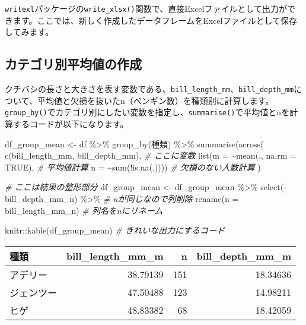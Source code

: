 \documentclass[
  xelatex,ja=standard, b5paper]{bxjsbook}
\newenvironment{Shaded}{\begin{snugshade}}{\end{snugshade}}
\newcommand{\AttributeTok}[1]{\textcolor[rgb]{0.77,0.63,0.00}{#1}}
\newcommand{\CommentTok}[1]{\textcolor[rgb]{0.56,0.35,0.01}{\textit{#1}}}
\newcommand{\ConstantTok}[1]{\textcolor[rgb]{0.00,0.00,0.00}{#1}}
\newcommand{\FunctionTok}[1]{\textcolor[rgb]{0.00,0.00,0.00}{#1}}
\newcommand{\NormalTok}[1]{#1}
\newcommand{\OtherTok}[1]{\textcolor[rgb]{0.56,0.35,0.01}{#1}}
\newcommand{\SpecialCharTok}[1]{\textcolor[rgb]{0.00,0.00,0.00}{#1}}
\begin{document}
\texttt{writexl}パッケージの\texttt{write\_xlsx()}関数で、直接Excelファイルとして出力ができます。ここでは、新しく作成したデータフレームをExcelファイルとして保存してみます。

\hypertarget{groupbymean}{%
\subsection{カテゴリ別平均値の作成}\label{groupbymean}}

クチバシの長さと大きさを表す変数である、\texttt{bill\_length\_mm}、\texttt{bill\_depth\_mm}について、平均値と欠損を抜いたn（ペンギン数）を種類別に計算します。\texttt{group\_by()}でカテゴリ別にしたい変数を指定し、\texttt{summarise()}で平均値とnを計算するコードが以下になります。

\begin{Shaded}
\begin{Highlighting}[]
\NormalTok{df\_group\_mean }\OtherTok{\textless{}{-}} 
\NormalTok{  df }\SpecialCharTok{\%\textgreater{}\%} 
  \FunctionTok{group\_by}\NormalTok{(種類) }\SpecialCharTok{\%\textgreater{}\%} 
  \FunctionTok{summarise}\NormalTok{(}\FunctionTok{across}\NormalTok{(}
                   \FunctionTok{c}\NormalTok{(bill\_length\_mm, bill\_depth\_mm), }\CommentTok{\# ここに変数}
                   \FunctionTok{list}\NormalTok{(}\AttributeTok{m =} \SpecialCharTok{\textasciitilde{}}\FunctionTok{mean}\NormalTok{(., }\AttributeTok{na.rm =} \ConstantTok{TRUE}\NormalTok{),  }\CommentTok{\# 平均値計算}
                        \AttributeTok{n =} \SpecialCharTok{\textasciitilde{}}\FunctionTok{sum}\NormalTok{(}\SpecialCharTok{!}\FunctionTok{is.na}\NormalTok{(.))))        }\CommentTok{\# 欠損のない人数計算}
\NormalTok{           )}

\CommentTok{\# ここは結果の整形部分}
\NormalTok{df\_group\_mean }\OtherTok{\textless{}{-}} 
\NormalTok{  df\_group\_mean }\SpecialCharTok{\%\textgreater{}\%}  
  \FunctionTok{select}\NormalTok{(}\SpecialCharTok{{-}}\NormalTok{bill\_depth\_mm\_n) }\SpecialCharTok{\%\textgreater{}\%}  \CommentTok{\# nが同じなので列削除}
  \FunctionTok{rename}\NormalTok{(}\AttributeTok{n =}\NormalTok{ bill\_length\_mm\_n)  }\CommentTok{\# 列名をnにリネーム}


\NormalTok{knitr}\SpecialCharTok{::}\FunctionTok{kable}\NormalTok{(df\_group\_mean) }\CommentTok{\# きれいな出力にするコード}
\end{Highlighting}
\end{Shaded}

\begin{tabular}{l|r|r|r}
\hline
種類 & bill\_length\_mm\_m & n & bill\_depth\_mm\_m\\
\hline
アデリー & 38.79139 & 151 & 18.34636\\
\hline
ジェンツー & 47.50488 & 123 & 14.98211\\
\hline
ヒゲ & 48.83382 & 68 & 18.42059\\
\hline
\end{tabular}
\end{document}
